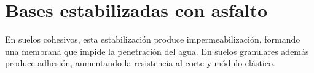 \documentclass[../main.tex]{subfiles}
\begin{document}
\section{Bases estabilizadas con asfalto}

En suelos cohesivos, esta estabilización produce impermeabilización, formando una
membrana que impide la penetración del agua. En suelos granulares además produce
adhesión, aumentando la resistencia al corte y módulo elástico.
\end{document}
